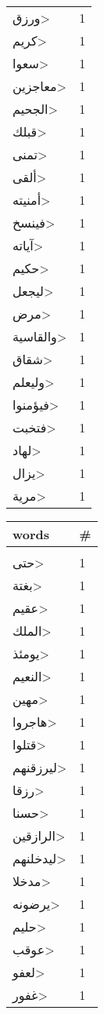 \documentclass{article}
\begin{document}
\begin{multicols}{6}
\begin{center}
\begin{tabular}{ P{2cm}  P{1cm}}
\<ورزق> & 1 \\ 
\<كريم> & 1 \\ 
\<سعوا> & 1 \\ 
\<معاجزين> & 1 \\ 
\<الجحيم> & 1 \\ 
\<قبلك> & 1 \\ 
\<تمنى> & 1 \\ 
\<ألقى> & 1 \\ 
\<أمنيته> & 1 \\ 
\<فينسخ> & 1 \\ 
\<آياته> & 1 \\ 
\<حكيم> & 1 \\ 
\<ليجعل> & 1 \\ 
\<مرض> & 1 \\ 
\<والقاسية> & 1 \\ 
\<شقاق> & 1 \\ 
\<وليعلم> & 1 \\ 
\<فيؤمنوا> & 1 \\ 
\<فتخبت> & 1 \\ 
\<لهاد> & 1 \\ 
\<يزال> & 1 \\ 
\<مرية> & 1 \\ 
\end{tabular} 
\begin{tabular}{ P{2cm}  P{1cm}} 
\textbf{words}    & \textbf{\#}  \\
\hline
\\[0.01cm]
\<حتى> & 1 \\ 
\<بغتة> & 1 \\ 
\<عقيم> & 1 \\ 
\<الملك> & 1 \\ 
\<يومئذ> & 1 \\ 
\<النعيم> & 1 \\ 
\<مهين> & 1 \\ 
\<هاجروا> & 1 \\ 
\<قتلوا> & 1 \\ 
\<ليرزقنهم> & 1 \\ 
\<رزقا> & 1 \\ 
\<حسنا> & 1 \\ 
\<الرازقين> & 1 \\ 
\<ليدخلنهم> & 1 \\ 
\<مدخلا> & 1 \\ 
\<يرضونه> & 1 \\ 
\<حليم> & 1 \\ 
\<عوقب> & 1 \\ 
\<لعفو> & 1 \\ 
\<غفور> & 1 \\ 

\end{tabular}
\end{center}
\end{multicols}
\end{document}
